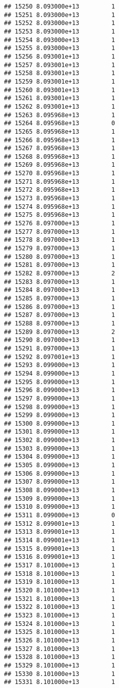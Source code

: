 \documentclass[
]{article}
\begin{document}
\begin{verbatim}
## 15250 8.093000e+13         1
## 15251 8.093000e+13         1
## 15252 8.093000e+13         1
## 15253 8.093000e+13         1
## 15254 8.093000e+13         1
## 15255 8.093000e+13         1
## 15256 8.093001e+13         1
## 15257 8.093001e+13         1
## 15258 8.093001e+13         1
## 15259 8.093001e+13         1
## 15260 8.093001e+13         1
## 15261 8.093001e+13         1
## 15262 8.093001e+13         1
## 15263 8.095968e+13         1
## 15264 8.095968e+13         0
## 15265 8.095968e+13         1
## 15266 8.095968e+13         1
## 15267 8.095968e+13         1
## 15268 8.095968e+13         1
## 15269 8.095968e+13         1
## 15270 8.095968e+13         1
## 15271 8.095968e+13         1
## 15272 8.095968e+13         1
## 15273 8.095968e+13         1
## 15274 8.095968e+13         1
## 15275 8.095968e+13         1
## 15276 8.097000e+13         1
## 15277 8.097000e+13         1
## 15278 8.097000e+13         1
## 15279 8.097000e+13         1
## 15280 8.097000e+13         1
## 15281 8.097000e+13         1
## 15282 8.097000e+13         2
## 15283 8.097000e+13         1
## 15284 8.097000e+13         1
## 15285 8.097000e+13         1
## 15286 8.097000e+13         1
## 15287 8.097000e+13         1
## 15288 8.097000e+13         1
## 15289 8.097000e+13         2
## 15290 8.097000e+13         1
## 15291 8.097000e+13         1
## 15292 8.097001e+13         1
## 15293 8.099000e+13         1
## 15294 8.099000e+13         1
## 15295 8.099000e+13         1
## 15296 8.099000e+13         1
## 15297 8.099000e+13         1
## 15298 8.099000e+13         1
## 15299 8.099000e+13         1
## 15300 8.099000e+13         1
## 15301 8.099000e+13         1
## 15302 8.099000e+13         1
## 15303 8.099000e+13         1
## 15304 8.099000e+13         1
## 15305 8.099000e+13         1
## 15306 8.099000e+13         1
## 15307 8.099000e+13         1
## 15308 8.099000e+13         1
## 15309 8.099000e+13         1
## 15310 8.099000e+13         1
## 15311 8.099000e+13         0
## 15312 8.099001e+13         1
## 15313 8.099001e+13         1
## 15314 8.099001e+13         1
## 15315 8.099001e+13         1
## 15316 8.099001e+13         1
## 15317 8.101000e+13         1
## 15318 8.101000e+13         1
## 15319 8.101000e+13         1
## 15320 8.101000e+13         1
## 15321 8.101000e+13         1
## 15322 8.101000e+13         1
## 15323 8.101000e+13         1
## 15324 8.101000e+13         1
## 15325 8.101000e+13         1
## 15326 8.101000e+13         1
## 15327 8.101000e+13         1
## 15328 8.101000e+13         1
## 15329 8.101000e+13         1
## 15330 8.101000e+13         1
## 15331 8.101000e+13         1

\end{verbatim}
\end{document}
